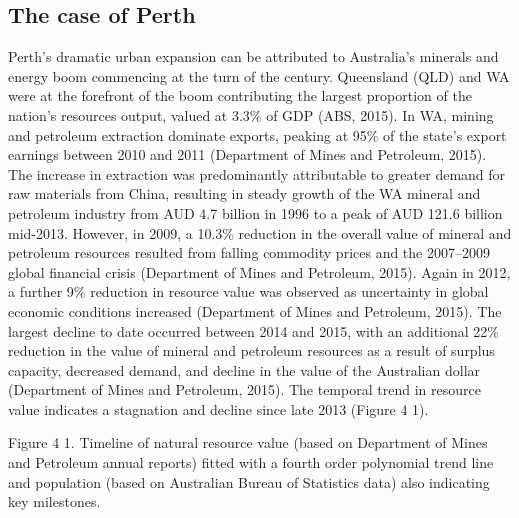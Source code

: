 \documentclass[]{book}
\begin{document}
\subsection{The case of Perth}\label{the-case-of-perth}

Perth's dramatic urban expansion can be attributed to Australia's
minerals and energy boom commencing at the turn of the century.
Queensland (QLD) and WA were at the forefront of the boom contributing
the largest proportion of the nation's resources output, valued at 3.3\%
of GDP (ABS, 2015). In WA, mining and petroleum extraction dominate
exports, peaking at 95\% of the state's export earnings between 2010 and
2011 (Department of Mines and Petroleum, 2015). The increase in
extraction was predominantly attributable to greater demand for raw
materials from China, resulting in steady growth of the WA mineral and
petroleum industry from AUD 4.7 billion in 1996 to a peak of AUD 121.6
billion mid-2013. However, in 2009, a 10.3\% reduction in the overall
value of mineral and petroleum resources resulted from falling commodity
prices and the 2007--2009 global financial crisis (Department of Mines
and Petroleum, 2015). Again in 2012, a further 9\% reduction in resource
value was observed as uncertainty in global economic conditions
increased (Department of Mines and Petroleum, 2015). The largest decline
to date occurred between 2014 and 2015, with an additional 22\%
reduction in the value of mineral and petroleum resources as a result of
surplus capacity, decreased demand, and decline in the value of the
Australian dollar (Department of Mines and Petroleum, 2015). The
temporal trend in resource value indicates a stagnation and decline
since late 2013 (Figure 4 1).

Figure 4 1. Timeline of natural resource value (based on Department of
Mines and Petroleum annual reports) fitted with a fourth order
polynomial trend line and population (based on Australian Bureau of
Statistics data) also indicating key milestones.
\end{document}
